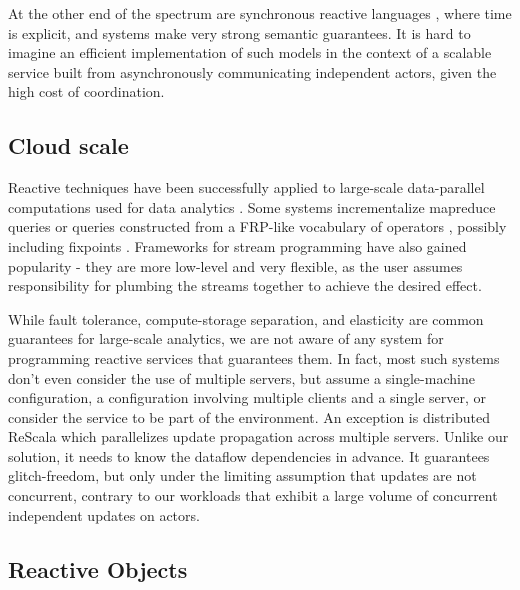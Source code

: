 At the other end of the spectrum are synchronous reactive languages \cite{lustre,signal,esterel,syncdataflow}, where time is explicit, and systems make very strong semantic guarantees. It is hard to imagine an efficient implementation of such models in the context of a scalable service built from asynchronously communicating independent actors, given the high cost of coordination.

\subsection{Cloud scale}

Reactive techniques have been successfully applied to large-scale data-parallel computations used for data analytics \cite{mapreduce,spark}. Some systems incrementalize mapreduce queries\cite{mronline,incoop} or queries constructed from a FRP-like vocabulary of operators \cite{nectar}, possibly including fixpoints \cite{frank}. Frameworks for stream programming \cite{flink} have also gained popularity - they are more low-level and very flexible, as the user assumes responsibility for plumbing the streams together to achieve the desired effect. 

While fault tolerance, compute-storage separation, and elasticity are common guarantees for large-scale analytics, we are not aware of any system for programming reactive services that guarantees them. In fact, most such systems don't even consider the use of multiple servers, but assume a single-machine configuration, a configuration involving multiple clients and a single server, or consider the service to be part of the environment. An exception is distributed ReScala\cite{drescala} which parallelizes update propagation across multiple servers. Unlike our solution, it needs to know the dataflow dependencies in advance. It guarantees glitch-freedom, but only under the limiting assumption that updates are not concurrent, contrary to our workloads that exhibit a large volume of concurrent independent updates on actors.

\subsection{Reactive Objects}

